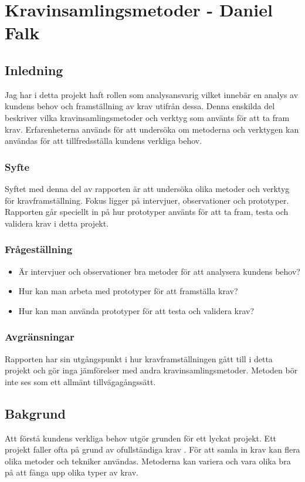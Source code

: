 \section{Kravinsamlingsmetoder - Daniel Falk}
\subsection{Inledning}
Jag har i detta projekt haft rollen som analysansvarig vilket innebär en analys av kundens behov och framställning av krav utifrån dessa. Denna enskilda del beskriver vilka kravinsamlingsmetoder och verktyg som använts för att ta fram krav. Erfarenheterna används för att undersöka om metoderna och verktygen kan användas för att tillfredsställa kundens verkliga behov.
\subsubsection{Syfte}
Syftet med denna del av rapporten är att undersöka olika metoder och verktyg för kravframställning. Fokus ligger på intervjuer, observationer och prototyper. Rapporten går speciellt in på hur prototyper använts för att ta fram, testa och validera krav i detta projekt.
\subsubsection{Frågeställning}
\begin{itemize}
\item Är intervjuer och observationer bra metoder för att analysera kundens behov?
\item Hur kan man arbeta med prototyper för att framställa krav?
\item Hur kan man använda prototyper för att testa och validera krav?
\end{itemize}
\subsubsection{Avgränsningar}
Rapporten har sin utgångspunkt i hur kravframställningen gått till i detta projekt och gör inga jämförelser med andra kravinsamlingsmetoder. Metoden bör inte ses som ett allmänt tillvägagångssätt.
\subsection{Bakgrund}
Att förstå kundens verkliga behov utgör grunden för ett lyckat projekt. Ett projekt faller ofta på grund av ofullständiga krav \cite{Hull}.
För att samla in krav kan flera olika metoder och tekniker användas. Metoderna kan variera och vara olika bra på att fånga upp olika typer av krav.
